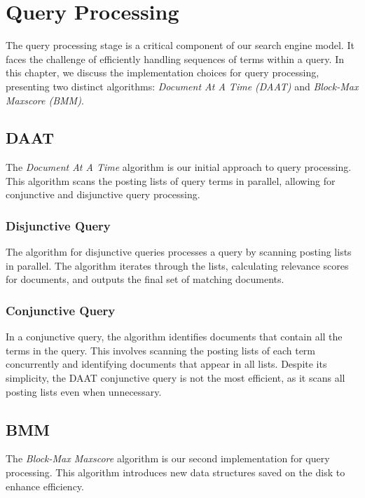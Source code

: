 \chapter{Query Processing}

The query processing stage is a critical component of our search engine model. It faces the challenge of efficiently handling 
sequences of terms within a query. In this chapter, we discuss the implementation choices for query processing, presenting two 
distinct algorithms: \textit{Document At A Time (DAAT)} and \textit{Block-Max Maxscore (BMM)}.

\section{DAAT}

The \textit{Document At A Time} algorithm is our initial approach to query processing. This algorithm scans the posting lists of 
query terms in parallel, allowing for conjunctive and disjunctive query processing.

\subsection{Disjunctive Query}

The algorithm for disjunctive queries processes a query by scanning posting lists in parallel. 
The algorithm iterates through the lists, calculating relevance scores for documents, and outputs the final set of 
matching documents.

\subsection{Conjunctive Query}

In a conjunctive query, the algorithm identifies documents that contain all the terms in the query. This involves scanning the 
posting lists of each term concurrently and identifying documents that appear in all lists. Despite its simplicity, the DAAT 
conjunctive query is not the most efficient, as it scans all posting lists even when unnecessary.

\section{BMM}

The \textit{Block-Max Maxscore} algorithm is our second implementation for query processing. This algorithm introduces new 
data structures saved on the disk to enhance efficiency.

